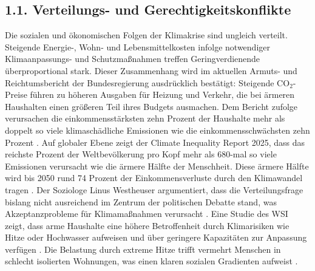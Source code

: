 \documentclass[12pt, a4paper]{article}
\begin{document}
	\subsection*{1.1. Verteilungs- und Gerechtigkeitskonflikte}
	Die sozialen und ökonomischen Folgen der Klimakrise sind ungleich verteilt.
	Steigende Energie-, Wohn- und Lebensmittelkosten infolge notwendiger
	Klimaanpassungs- und Schutzmaßnahmen treffen Geringverdienende überproportional stark.
	Dieser Zusammenhang wird im aktuellen Armuts- und Reichtumsbericht der Bundesregierung
	ausdrücklich bestätigt: Steigende CO$_2$-Preise führen zu höheren Ausgaben für Heizung
	und Verkehr, die bei ärmeren Haushalten einen größeren Teil ihres Budgets ausmachen.
	Dem Bericht zufolge verursachen die einkommensstärksten zehn Prozent der Haushalte
	mehr als doppelt so viele klimaschädliche Emissionen wie die einkommensschwächsten
	zehn Prozent \cite{armutsbericht2025}. Auf globaler Ebene zeigt der Climate Inequality
	Report 2025, dass das reichste Prozent der Weltbevölkerung pro Kopf mehr als
	680-mal so viele Emissionen verursacht wie die ärmere Hälfte der Menschheit. Diese
	ärmere Hälfte wird bis 2050 rund 74 Prozent der Einkommensverluste durch den
	Klimawandel tragen \cite{climateinequality2025}. Der Soziologe Linus Westheuser
	argumentiert, dass die Verteilungsfrage bislang nicht ausreichend im Zentrum der
	politischen Debatte stand, was Akzeptanzprobleme für Klimamaßnahmen verursacht
	\cite{westheuser2025}. Eine Studie des WSI zeigt, dass arme Haushalte eine höhere
	Betroffenheit durch Klimarisiken wie Hitze oder Hochwasser aufweisen und über
	geringere Kapazitäten zur Anpassung verfügen \cite{rehm2025}. Die Belastung durch
	extreme Hitze trifft vermehrt Menschen in schlecht isolierten Wohnungen, was einen
	klaren sozialen Gradienten aufweist \cite{umweltbundesamt2026}.
	
\end{document}
